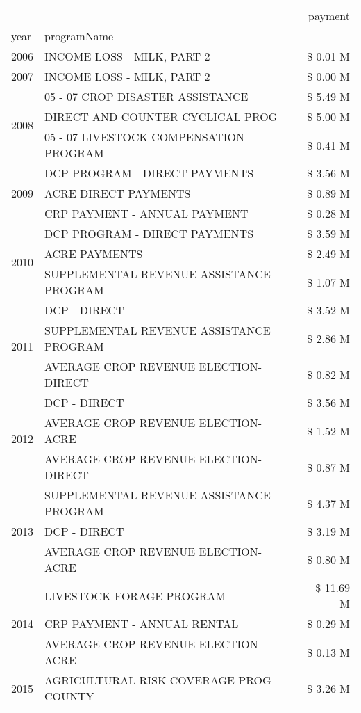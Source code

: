 \begin{tabular}{llr}
\toprule
 &  & payment \\
year & programName &  \\
\midrule
2006 & INCOME LOSS - MILK, PART 2 & \$ 0.01 M \\
\cline{1-3}
2007 & INCOME LOSS - MILK, PART 2 & \$ 0.00 M \\
\cline{1-3}
\multirow[t]{3}{*}{2008} & 05 - 07 CROP DISASTER ASSISTANCE & \$ 5.49 M \\
 & DIRECT AND COUNTER CYCLICAL PROG & \$ 5.00 M \\
 & 05 - 07 LIVESTOCK COMPENSATION PROGRAM & \$ 0.41 M \\
\cline{1-3}
\multirow[t]{3}{*}{2009} & DCP PROGRAM - DIRECT PAYMENTS & \$ 3.56 M \\
 & ACRE DIRECT PAYMENTS & \$ 0.89 M \\
 & CRP PAYMENT - ANNUAL PAYMENT & \$ 0.28 M \\
\cline{1-3}
\multirow[t]{3}{*}{2010} & DCP PROGRAM - DIRECT PAYMENTS & \$ 3.59 M \\
 & ACRE PAYMENTS & \$ 2.49 M \\
 & SUPPLEMENTAL REVENUE ASSISTANCE PROGRAM & \$ 1.07 M \\
\cline{1-3}
\multirow[t]{3}{*}{2011} & DCP - DIRECT & \$ 3.52 M \\
 & SUPPLEMENTAL REVENUE ASSISTANCE PROGRAM & \$ 2.86 M \\
 & AVERAGE CROP REVENUE ELECTION-DIRECT & \$ 0.82 M \\
\cline{1-3}
\multirow[t]{3}{*}{2012} & DCP - DIRECT & \$ 3.56 M \\
 & AVERAGE CROP REVENUE ELECTION-ACRE & \$ 1.52 M \\
 & AVERAGE CROP REVENUE ELECTION-DIRECT & \$ 0.87 M \\
\cline{1-3}
\multirow[t]{3}{*}{2013} & SUPPLEMENTAL REVENUE ASSISTANCE PROGRAM & \$ 4.37 M \\
 & DCP - DIRECT & \$ 3.19 M \\
 & AVERAGE CROP REVENUE ELECTION-ACRE & \$ 0.80 M \\
\cline{1-3}
\multirow[t]{3}{*}{2014} & LIVESTOCK FORAGE PROGRAM & \$ 11.69 M \\
 & CRP PAYMENT - ANNUAL RENTAL & \$ 0.29 M \\
 & AVERAGE CROP REVENUE ELECTION-ACRE & \$ 0.13 M \\
\cline{1-3}
\multirow[t]{3}{*}{2015} & AGRICULTURAL RISK COVERAGE PROG - COUNTY & \$ 3.26 M \\

\end{tabular}
